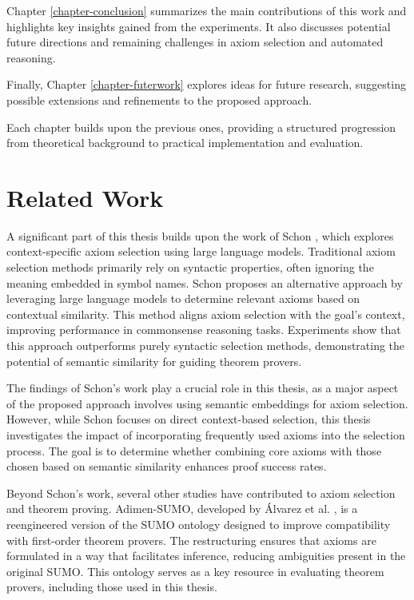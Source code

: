 \documentclass[english,version-2020-11]{uzl-thesis}
\begin{document}
Chapter \ref{chapter-conclusion} summarizes the main contributions of this work and highlights key insights gained from the experiments. It also discusses potential future directions and remaining challenges in axiom selection and automated reasoning.

Finally, Chapter \ref{chapter-futerwork} explores ideas for future research, suggesting possible extensions and refinements to the proposed approach.

Each chapter builds upon the previous ones, providing a structured progression from theoretical background to practical implementation and evaluation.


\chapter{Related Work}
\label{chapter-relatedwork}

A significant part of this thesis builds upon the work of Schon \cite{Schon2024}, which explores context-specific axiom selection using large language models. Traditional axiom selection methods primarily rely on syntactic properties, often ignoring the meaning embedded in symbol names. Schon proposes an alternative approach by leveraging large language models to determine relevant axioms based on contextual similarity. This method aligns axiom selection with the goal’s context, improving performance in commonsense reasoning tasks. Experiments show that this approach outperforms purely syntactic selection methods, demonstrating the potential of semantic similarity for guiding theorem provers.

The findings of Schon's work play a crucial role in this thesis, as a major aspect of the proposed approach involves using semantic embeddings for axiom selection. However, while Schon focuses on direct context-based selection, this thesis investigates the impact of incorporating frequently used axioms into the selection process. The goal is to determine whether combining core axioms with those chosen based on semantic similarity enhances proof success rates.

Beyond Schon's work, several other studies have contributed to axiom selection and theorem proving. Adimen-SUMO, developed by Álvarez et al. \cite{Alvez2014}, is a reengineered version of the SUMO ontology designed to improve compatibility with first-order theorem provers. The restructuring ensures that axioms are formulated in a way that facilitates inference, reducing ambiguities present in the original SUMO. This ontology serves as a key resource in evaluating theorem provers, including those used in this thesis.
\end{document}
